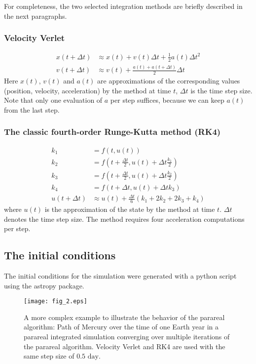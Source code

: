 \documentclass[conference]{IEEEtran}
\begin{document}
For completeness, the two selected integration methods are briefly described in the next paragraphs.
\subsubsection{Velocity Verlet}

\begin{align*}
x(t+\Delta t) &\approx x(t) + v(t)\Delta t + \frac{1}{2}a(t)\Delta t^2 \\
v(t+\Delta t) &\approx v(t) + \frac{a(t) + a(t+\Delta t)}{2}\Delta t
\end{align*}
Here $x(t)$, $v(t)$ and $a(t)$ are approximations of the corresponding values (position, velocity, acceleration) by the method at time $t$, $\Delta t$ is the time step size. Note that only one evaluation of $a$ per step suffices, because we can keep $a(t)$ from the last step. \cite{forverlet}

\subsubsection{The classic fourth-order Runge-Kutta method (RK4)}
\begin{align*}
k_1 &= f(t, u(t)) \\
k_2 &= f(t + \frac{\Delta t}{2}, u(t) + \Delta t\frac{k_1}{2}) \\
k_3 &= f(t + \frac{\Delta t}{2}, u(t) + \Delta t\frac{k_2}{2}) \\
k_4 &= f(t + \Delta t, u(t) + \Delta t k_3) \\
u(t+\Delta t) &\approx u(t) + \frac{\Delta t}{6}\left(k_1 + 2k_2 + 2k_3 + k_4\right)
\end{align*}
where $u(t)$ is the approximation of the state by the method at time $t$. $\Delta t$ denotes the time step size. The method requires four acceleration computations per step. \cite{forrk4}

\subsection{The initial conditions}
The initial conditions for the simulation were generated with a python script using the astropy package. \cite{astropy}

\begin{figure}[htbp]
\centerline{\texttt{[image: fig\_2.eps]}}
\caption{A more complex example to illustrate the behavior of the parareal algorithm: Path of Mercury over the time of one Earth year in a parareal integrated simulation converging over multiple iterations of the parareal algorithm. Velocity Verlet and RK4 are used with the same step size of $0.5\text{ day}$.}
\label{mercury}
\end{figure}
\end{document}
